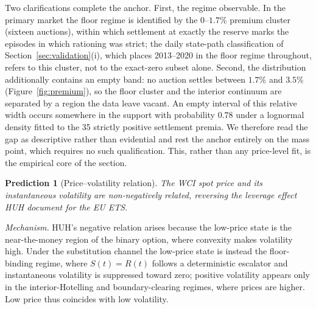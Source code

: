 \documentclass[11pt,letterpaper]{article}
\theoremstyle{plain}
\newtheorem{prediction}{Prediction}[section]
\theoremstyle{definition}
\numberwithin{equation}{section}
\begin{document}
Two clarifications complete the anchor. First, the regime observable. In the primary market the floor regime is identified by the $0$--$1.7\%$ premium cluster (sixteen auctions), within which settlement at exactly the reserve marks the episodes in which rationing was strict; the daily state-path classification of Section~\ref{sec:validation}(i), which places 2013--2020 in the floor regime throughout, refers to this cluster, not to the exact-zero subset alone. Second, the distribution additionally contains an empty band: no auction settles between $1.7\%$ and $3.5\%$ (Figure~\ref{fig:premium}), so the floor cluster and the interior continuum are separated by a region the data leave vacant. An empty interval of this relative width occurs somewhere in the support with probability $0.78$ under a lognormal density fitted to the 35 strictly positive settlement premia. We therefore read the gap as descriptive rather than evidential and rest the anchor entirely on the mass point, which requires no such qualification. This, rather than any price-level fit, is the empirical core of the section.
 
\begin{prediction}[Price--volatility relation]\label{pred:volprice}
The WCI spot price and its instantaneous volatility are non-negatively related, reversing the leverage effect HUH document for the EU ETS. 
\end{prediction}
 
\noindent\emph{Mechanism.} HUH's negative relation arises because the low-price state is the near-the-money region of the binary option, where convexity makes volatility high. Under the substitution channel the low-price state is instead the floor-binding regime, where $S(t)=R(t)$ follows a deterministic escalator and instantaneous volatility is suppressed toward zero; positive volatility appears only in the interior-Hotelling and boundary-clearing regimes, where prices are higher. Low price thus coincides with low volatility. 
\end{document}
